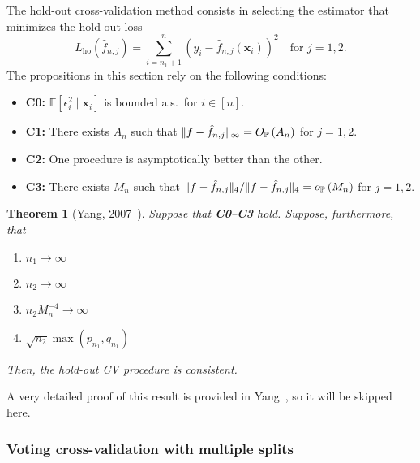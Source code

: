 \documentclass[12pt, letter paper]{article}
\newcommand{\1}{\mathmybb{1}}
\newtheorem{theorem}[proposition]{Theorem}
\newcommand{\0}{\emptyset}
\newcommand{\prob}{\mathbb{P}}
\newcommand{\Ep}[1]{\mathbb{E}\left[ #1 \right]}
\newcommand{\paren}[1]{\left(#1 \right)}
\newcommand{\norm}[1]{|\hspace{-1pt}|#1 |\hspace{-1pt}|}
\newcommand{\x}{\boldsymbol{x}}
\newcommand{\op}[1]{o_{\prob}\paren{#1}}
\newcommand{\Op}[1]{O_{\prob}\paren{#1}}
\newcommand{\fhat}[2]{\hat{f}_{#1, #2}}
\begin{document}
The hold-out cross-validation method consists in selecting the estimator that minimizes the hold-out loss
\[L_{\mathrm{ho}}(\fhat{n}{j}) = \sum_{i=n_{1}+1}^{n}\paren{y_{i} - \fhat{n}{j}(\x_{i})}^{2}\quad\text{for }j=1,2.\]
The propositions in this section rely on the following conditions:
\begin{itemize}
    \item \textbf{C0:} \(\Ep{\epsilon_{i}^{2}\mid \x_{i}}\) is bounded a.s.\ for \(i\in[n]\).
    \item \textbf{C1:} There exists \(A_{n}\) such that \(\norm{f-\fhat{n}{j}}_{\infty} = \Op{A_{n}}\) for \(j=1,2\).
    \item \textbf{C2:} One procedure is asymptotically better than the other.
    \item \textbf{C3:} There exists \(M_{n}\) such that \(\norm{f-\fhat{n}{j}}_{4} / \norm{f-\fhat{n}{j}}_{4} = \op{M_{n}}\) for \(j=1,2\).
\end{itemize}

\begin{theorem}[Yang, 2007~\cite{yang_2007}]\label{prop:yangth1}
    Suppose that \textbf{C0}--\textbf{C3} hold. Suppose, furthermore, that
    \begin{enumerate}
        \item \(n_{1}\to\infty\)
        \item \(n_{2}\to\infty\)
        \item \(n_{2}M_{n}^{-4} \to \infty\)
        \item \(\sqrt{n_{2}}\max(p_{n_{1}}, q_{n_{1}})\)
    \end{enumerate}
    Then, the hold-out CV procedure is consistent.
\end{theorem}

A very detailed proof of this result is provided in Yang~\cite{yang_2007}, so it will be skipped here.

\subsubsection{Voting cross-validation with multiple splits}
\end{document}
